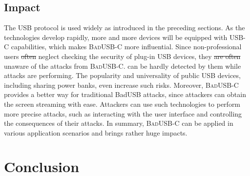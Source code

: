 \documentclass[conference]{IEEEtran}
\newcommand{\tool}{\mbox{\textsc{BadUSB-C}}\xspace}
\newcommand{\outline}[1]{}
\newcommand{\shuqing}[1]{}
\providecommand{\DIFaddtex}[1]{{\protect\color{blue}\uwave{#1}}} %
\providecommand{\DIFdeltex}[1]{{\protect\color{red}\sout{#1}}}                      %
\providecommand{\DIFaddbegin}{} %
\providecommand{\DIFaddend}{} %
\providecommand{\DIFdelbegin}{} %
\providecommand{\DIFdelend}{} %
\providecommand{\DIFadd}[1]{\texorpdfstring{\DIFaddtex{#1}}{#1}} %
\providecommand{\DIFdel}[1]{\texorpdfstring{\DIFdeltex{#1}}{}} %
\newcommand{\DIFscaledelfig}{0.5}
\newlength{\DIFdelgraphicswidth} %
\newlength{\DIFdelgraphicsheight} %
\newcommand{\DIFaddincludegraphics}[2][]{{\color{blue}\fbox{\DIFOincludegraphics[#1]{#2}}}} %
\newcommand{\DIFdelincludegraphics}[2][]{%
\sbox{\DIFdelgraphicsbox}{\DIFOincludegraphics[#1]{#2}}%
\settoboxwidth{\DIFdelgraphicswidth}{\DIFdelgraphicsbox} %
\settoboxtotalheight{\DIFdelgraphicsheight}{\DIFdelgraphicsbox} %
\scalebox{\DIFscaledelfig}{%
\parbox[b]{\DIFdelgraphicswidth}{\usebox{\DIFdelgraphicsbox}\\[-\baselineskip] \rule{\DIFdelgraphicswidth}{0em}}\llap{\resizebox{\DIFdelgraphicswidth}{\DIFdelgraphicsheight}{%
\setlength{\unitlength}{\DIFdelgraphicswidth}%
\begin{picture}(1,1)%
\thicklines\linethickness{2pt} %
{\color[rgb]{1,0,0}\put(0,0){\framebox(1,1){}}}%
{\color[rgb]{1,0,0}\put(0,0){\line( 1,1){1}}}%
{\color[rgb]{1,0,0}\put(0,1){\line(1,-1){1}}}%
\end{picture}%
}\hspace*{3pt}}} %
} %
\DeclareRobustCommand{\DIFaddbegin}{\DIFOaddbegin \let\includegraphics\DIFaddincludegraphics} %
\DeclareRobustCommand{\DIFaddend}{\DIFOaddend \let\includegraphics\DIFOincludegraphics} %
\DeclareRobustCommand{\DIFdelbegin}{\DIFOdelbegin \let\includegraphics\DIFdelincludegraphics} %
\DeclareRobustCommand{\DIFdelend}{\DIFOaddend \let\includegraphics\DIFOincludegraphics} %
\begin{document}

\subsection{Impact}

The \ac{USB} protocol is used widely as introduced in the preceding sections.  As the
technologies develop rapidly, more and more devices will be equipped with USB-C
capabilities\DIFaddbegin \DIFadd{~\mbox{%
\cite{li2018usb}}\hspace{0pt}%
}\DIFaddend , which makes \tool more influential.  
Since non-professional users \DIFdelbegin \DIFdel{often }\DIFdelend \DIFaddbegin \DIFadd{may }\DIFaddend neglect checking the security of plug-in \ac{USB} devices, 
they \DIFdelbegin \DIFdel{are often }\DIFdelend \DIFaddbegin \DIFadd{may }\DIFaddend unaware of the attacks from \tool.
can be hardly detected by them while attacks are performing.  
The popularity and universality of public \ac{USB} devices, including sharing power banks, even
increase such risks.  Moreover, \tool provides a better way for traditional
BadUSB attacks, since attackers can obtain the screen streaming with ease.
Attackers can use such technologies to perform more precise attacks, such as
interacting with the user interface and controlling the consequences of their
attacks.  In summary, \tool can be applied in various application scenarios and
brings rather huge impacts.

\section{Conclusion}
\label{sec:conclusion}
\outline{Conclusion}
\end{document}
